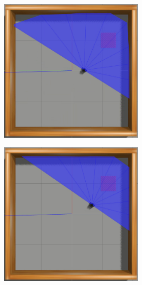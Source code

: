 \begin{figure}[H]
\begin{center}
\begin{subfigure}[b]{0.60\textwidth}
        \begin{subfigure}[b]{0.24\textwidth}
            \includegraphics[width=\textwidth]{imagens/simulated_envs/sim_env1_ddpg/5.png}
        \end{subfigure}
        \hfill
        \begin{subfigure}[b]{0.24\textwidth}
            \includegraphics[width=\textwidth]{imagens/simulated_envs/sim_env1_ddpg/6.png}

\end{subfigure}
\end{subfigure}
\end{center}
\end{figure}
